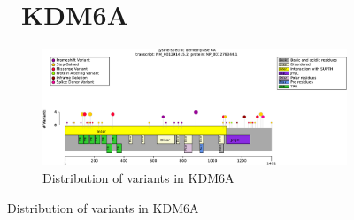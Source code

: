 \begin{figure}[htbp]
\section*{ KDM6A}
\centering
\begin{subfigure}[b]{0.95\textwidth}
\centering
\includegraphics[width=\textwidth]{ img/KDM6A_protein_diagram.pdf} 
\captionsetup{justification=raggedright,singlelinecheck=false}
\caption{Distribution of variants in KDM6A}
\end{subfigure}

\vspace{2em}


\end{figure}
